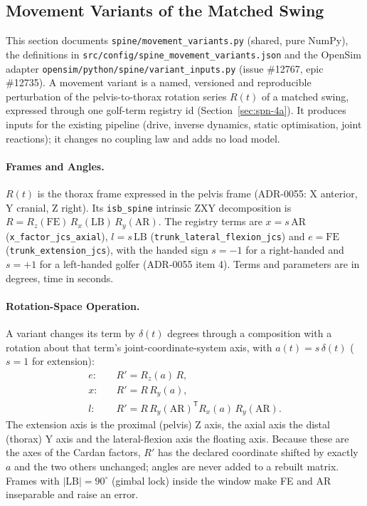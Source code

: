 \subsection{Movement Variants of the Matched Swing}
\label{sec:spn-13b}

This section documents \texttt{spine/movement\_variants.py} (shared, pure
NumPy), the definitions in \texttt{src/config/spine\_movement\_variants.json}
and the OpenSim adapter \texttt{opensim/python/spine/variant\_inputs.py}
(issue \#12767, epic \#12735). A movement variant is a named, versioned and
reproducible perturbation of the pelvis-to-thorax rotation series $R(t)$ of a
matched swing, expressed through one golf-term registry id
(Section~\ref{sec:spn-4a}). It produces inputs for the existing pipeline
(drive, inverse dynamics, static optimisation, joint reactions); it changes no
coupling law and adds no load model.

\paragraph{Frames and Angles.}
$R(t)$ is the thorax frame expressed in the pelvis frame (ADR-0055: X
anterior, Y cranial, Z right). Its \texttt{isb\_spine} intrinsic ZXY
decomposition is $R = R_z(\mathrm{FE})\,R_x(\mathrm{LB})\,R_y(\mathrm{AR})$.
The registry terms are $x = s\,\mathrm{AR}$
(\texttt{x\_factor\_jcs\_axial}), $l = s\,\mathrm{LB}$
(\texttt{trunk\_lateral\_flexion\_jcs}) and $e = \mathrm{FE}$
(\texttt{trunk\_extension\_jcs}), with the handed sign $s=-1$ for a
right-handed and $s=+1$ for a left-handed golfer (ADR-0055 item 4). Terms and
parameters are in degrees, time in seconds.

\paragraph{Rotation-Space Operation.}
A variant changes its term by $\delta(t)$ degrees through a composition with a
rotation about that term's joint-coordinate-system axis, with
$a(t) = s\,\delta(t)$ ($s=1$ for extension):
\begin{align}
  e:&\quad R' = R_z(a)\,R, \\
  x:&\quad R' = R\,R_y(a), \\
  l:&\quad R' = R\,R_y(\mathrm{AR})^{\mathsf T} R_x(a)\, R_y(\mathrm{AR}).
\end{align}
The extension axis is the proximal (pelvis) Z axis, the axial axis the distal
(thorax) Y axis and the lateral-flexion axis the floating axis. Because these
are the axes of the Cardan factors, $R'$ has the declared coordinate shifted by
exactly $a$ and the two others unchanged; angles are never added to a rebuilt
matrix. Frames with $|\mathrm{LB}| = 90^\circ$ (gimbal lock) inside the window
make FE and AR inseparable and raise an error.


